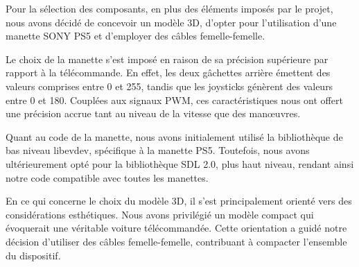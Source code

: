 Pour la sélection des composants, en plus des éléments imposés par le projet, nous avons décidé de concevoir un modèle 3D, d'opter pour l'utilisation d'une manette SONY PS5 et d'employer des câbles femelle-femelle.

Le choix de la manette s'est imposé en raison de sa précision supérieure par rapport à la télécommande. En effet, les deux gâchettes arrière émettent des valeurs comprises entre 0 et 255, tandis que les joysticks génèrent des valeurs entre 0 et 180. Couplées aux signaux PWM, ces caractéristiques nous ont offert une précision accrue tant au niveau de la vitesse que des manœuvres.

Quant au code de la manette, nous avons initialement utilisé la bibliothèque de bas niveau libevdev, spécifique à la manette PS5. Toutefois, nous avons ultérieurement opté pour la bibliothèque SDL 2.0, plus haut niveau, rendant ainsi notre code compatible avec toutes les manettes.

En ce qui concerne le choix du modèle 3D, il s'est principalement orienté vers des considérations esthétiques. Nous avons privilégié un modèle compact qui évoquerait une véritable voiture télécommandée. Cette orientation a guidé notre décision d'utiliser des câbles femelle-femelle, contribuant à compacter l'ensemble du dispositif.

\newpage